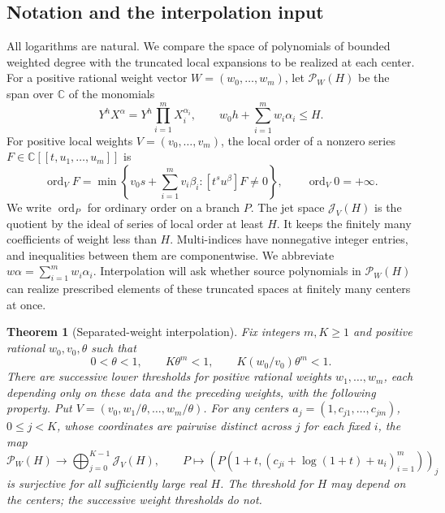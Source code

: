\documentclass[11pt]{article}
\newtheorem{theorem}{Theorem}[section]
\theoremstyle{definition}
\theoremstyle{remark}
\newcommand{\C}{\mathbb C}
\newcommand{\ord}{\operatorname{ord}}
\newcommand{\Pcal}{\mathcal P}
\newcommand{\Jcal}{\mathcal J}
\numberwithin{equation}{section}
\begin{document}
\subsection{Notation and the interpolation input}
All logarithms are natural. We compare the space of polynomials of
bounded weighted degree with the truncated local expansions to be
realized at each center. For a
positive rational weight vector
\(W=(w_0,\ldots,w_m)\), let \(\Pcal_W(H)\) be the span over \(\C\)
of the monomials
\[
 Y^hX^\alpha=Y^h\prod_{i=1}^mX_i^{\alpha_i},
 \qquad w_0h+\sum_{i=1}^mw_i\alpha_i\le H.
\]
For positive local weights \(V=(v_0,\ldots,v_m)\), the local order
of a nonzero series \(F\in\C[[t,u_1,\ldots,u_m]]\) is
\[
 \ord_V F=\min\left\{v_0s+\sum_{i=1}^m v_i\beta_i:
                     [t^su^\beta]F\ne0\right\},\qquad
 \ord_V 0=+\infty.
\]
We write \(\ord_P\) for ordinary order on a branch \(P\). The jet
space \(\Jcal_V(H)\) is the quotient by the ideal of series of local
order at least \(H\). It keeps the finitely many coefficients of
weight less than \(H\). Multi-indices have nonnegative integer entries,
and inequalities between them are componentwise. We abbreviate
\(w\alpha=\sum_{i=1}^m w_i\alpha_i\).
Interpolation will ask whether source polynomials in \(\Pcal_W(H)\) can
realize prescribed elements of these truncated spaces at finitely many
centers at once.

\begin{theorem}[Separated-weight interpolation]\label{thm:interpolation}
Fix integers \(m,K\ge1\) and positive rational \(w_0,v_0,\theta\)
such that
\begin{equation}\label{eq:volume}
 0<\theta<1,\qquad K\theta^m<1,\qquad
 K(w_0/v_0)\theta^m<1.
\end{equation}
There are successive lower thresholds for positive rational weights
\(w_1,\ldots,w_m\), each depending only on these data and the preceding
weights, with the following property. Put
\(V=(v_0,w_1/\theta,\ldots,w_m/\theta)\). For any centers
\(a_j=(1,c_{j1},\ldots,c_{jm})\), \(0\le j<K\), whose coordinates
are pairwise distinct across \(j\) for each fixed \(i\), the map
\begin{equation}\label{eq:interpolation}
 \Pcal_W(H)\longrightarrow\bigoplus_{j=0}^{K-1}\Jcal_V(H),\qquad
 P\longmapsto
 \left(P(1+t,(c_{ji}+\log(1+t)+u_i)_{i=1}^m)\right)_j
\end{equation}
is surjective for all sufficiently large real \(H\).
The threshold for \(H\) may depend on the centers; the successive
weight thresholds do not.
\end{theorem}
\end{document}
